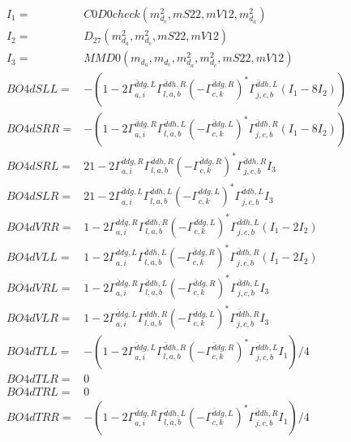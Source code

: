 \documentclass[A4,landscape]{article}
\begin{document}
\begin{align} 
I_1 = & C0D0check(m^2_{d_{{c}}}, mS22, mV12, m^2_{d_{{a}}}) \\ 
I_2 = & D_{27}(m^2_{d_{{a}}}, m^2_{d_{{c}}}, mS22, mV12) \\ 
I_3 = & MMD0(m_{d_{{a}}}, m_{d_{{c}}}, m^2_{d_{{a}}}, m^2_{d_{{c}}}, mS22, mV12) \\ 
  BO4dSLL= & -(1
-
2 \Gamma^{\bar{d}d g ,L}_{a, i} \Gamma^{\bar{d}d h ,R}_{l, a, b} (- \Gamma^{\bar{d}d g ,R} _{c, k})^* \Gamma^{\bar{d}d h ,L}_{j, c, b} (I_1 - 8 I_2)) \\ 
  BO4dSRR= & -(1
-
2 \Gamma^{\bar{d}d g ,R}_{a, i} \Gamma^{\bar{d}d h ,L}_{l, a, b} (- \Gamma^{\bar{d}d g ,L} _{c, k})^* \Gamma^{\bar{d}d h ,R}_{j, c, b} (I_1 - 8 I_2)) \\ 
  BO4dSRL= & 2 1
-
2 \Gamma^{\bar{d}d g ,R}_{a, i} \Gamma^{\bar{d}d h ,R}_{l, a, b} (- \Gamma^{\bar{d}d g ,R} _{c, k})^* \Gamma^{\bar{d}d h ,R}_{j, c, b} I_3 \\ 
  BO4dSLR= & 2 1
-
2 \Gamma^{\bar{d}d g ,L}_{a, i} \Gamma^{\bar{d}d h ,L}_{l, a, b} (- \Gamma^{\bar{d}d g ,L} _{c, k})^* \Gamma^{\bar{d}d h ,L}_{j, c, b} I_3 \\ 
  BO4dVRR= & 1
-
2 \Gamma^{\bar{d}d g ,R}_{a, i} \Gamma^{\bar{d}d h ,R}_{l, a, b} (- \Gamma^{\bar{d}d g ,L} _{c, k})^* \Gamma^{\bar{d}d h ,L}_{j, c, b} (I_1 - 2 I_2) \\ 
  BO4dVLL= & 1
-
2 \Gamma^{\bar{d}d g ,L}_{a, i} \Gamma^{\bar{d}d h ,L}_{l, a, b} (- \Gamma^{\bar{d}d g ,R} _{c, k})^* \Gamma^{\bar{d}d h ,R}_{j, c, b} (I_1 - 2 I_2) \\ 
  BO4dVRL= & 1
-
2 \Gamma^{\bar{d}d g ,R}_{a, i} \Gamma^{\bar{d}d h ,L}_{l, a, b} (- \Gamma^{\bar{d}d g ,R} _{c, k})^* \Gamma^{\bar{d}d h ,L}_{j, c, b} I_3 \\ 
  BO4dVLR= & 1
-
2 \Gamma^{\bar{d}d g ,L}_{a, i} \Gamma^{\bar{d}d h ,R}_{l, a, b} (- \Gamma^{\bar{d}d g ,L} _{c, k})^* \Gamma^{\bar{d}d h ,R}_{j, c, b} I_3 \\ 
  BO4dTLL= & -(1
-
2 \Gamma^{\bar{d}d g ,L}_{a, i} \Gamma^{\bar{d}d h ,R}_{l, a, b} (- \Gamma^{\bar{d}d g ,R} _{c, k})^* \Gamma^{\bar{d}d h ,L}_{j, c, b} I_1)/4 \\ 
  BO4dTLR= & 0 \\ 
  BO4dTRL= & 0 \\ 
  BO4dTRR= & -(1
-
2 \Gamma^{\bar{d}d g ,R}_{a, i} \Gamma^{\bar{d}d h ,L}_{l, a, b} (- \Gamma^{\bar{d}d g ,L} _{c, k})^* \Gamma^{\bar{d}d h ,R}_{j, c, b} I_1)/4 \\ 
\end{align} 
\end{document}
